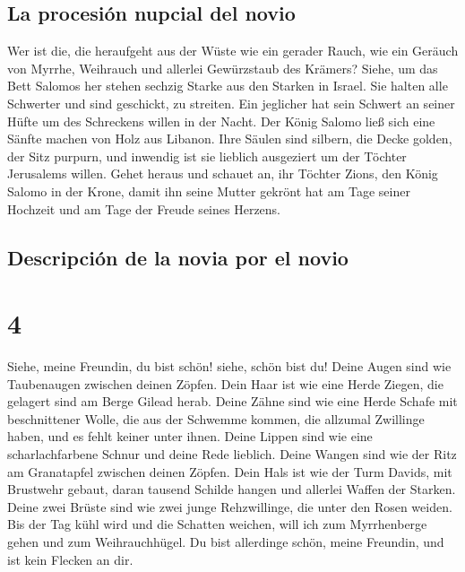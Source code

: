 \hypertarget{la-procesiuxf3n-nupcial-del-novio}{%
\subsection{La procesión nupcial del
novio}\label{la-procesiuxf3n-nupcial-del-novio}}

 Wer ist die, die heraufgeht aus der Wüste wie ein gerader
Rauch, wie ein Geräuch von Myrrhe, Weihrauch und allerlei Gewürzstaub
des Krämers?  Siehe, um das Bett Salomos her stehen
sechzig Starke aus den Starken in Israel.  Sie halten alle
Schwerter und sind geschickt, zu streiten. Ein jeglicher hat sein
Schwert an seiner Hüfte um des Schreckens willen in der Nacht.
 Der König Salomo ließ sich eine Sänfte machen von Holz
aus Libanon.  Ihre Säulen sind silbern, die Decke golden,
der Sitz purpurn, und inwendig ist sie lieblich ausgeziert um der
Töchter Jerusalems willen.  Gehet heraus und schauet an,
ihr Töchter Zions, den König Salomo in der Krone, damit ihn seine Mutter
gekrönt hat am Tage seiner Hochzeit und am Tage der Freude seines
Herzens.

\hypertarget{descripciuxf3n-de-la-novia-por-el-novio}{%
\subsection{Descripción de la novia por el
novio}\label{descripciuxf3n-de-la-novia-por-el-novio}}

\hypertarget{section-3}{%
\section{4}\label{section-3}}

 Siehe, meine Freundin, du bist schön! siehe, schön bist
du! Deine Augen sind wie Taubenaugen zwischen deinen Zöpfen. Dein Haar
ist wie eine Herde Ziegen, die gelagert sind am Berge Gilead herab.
 Deine Zähne sind wie eine Herde Schafe mit beschnittener
Wolle, die aus der Schwemme kommen, die allzumal Zwillinge haben, und es
fehlt keiner unter ihnen.  Deine Lippen sind wie eine
scharlachfarbene Schnur und deine Rede lieblich. Deine Wangen sind wie
der Ritz am Granatapfel zwischen deinen Zöpfen.  Dein Hals
ist wie der Turm Davids, mit Brustwehr gebaut, daran tausend Schilde
hangen und allerlei Waffen der Starken.  Deine zwei Brüste
sind wie zwei junge Rehzwillinge, die unter den Rosen weiden.
 Bis der Tag kühl wird und die Schatten weichen, will ich
zum Myrrhenberge gehen und zum Weihrauchhügel.  Du bist
allerdinge schön, meine Freundin, und ist kein Flecken an dir.


